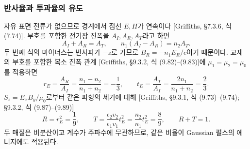 \documentclass[11pt,a4paper]{article}
\begin{document}
\subsubsection{반사율과 투과율의 유도}
자유 표면 전류가 없으므로 경계에서 접선 $E,H$가 연속이다
[Griffiths, §7.3.6, 식 (7.74)]. 부호를 포함한 전기장 진폭을 $A_I,A_R,A_T$라고 하면
\begin{equation}A_I+A_R=A_T,\qquad n_1(A_I-A_R)=n_2A_T.\end{equation}
두 번째 식의 마이너스는 반사파가 $-z$로 가므로 $B_R=-n_1E_R/c$이기 때문이다.
교재의 부호를 포함한 복소 진폭 관계 [Griffiths, §9.3.2, 식 (9.82)--(9.83)]에
$\mu_1=\mu_2=\mu_0$를 적용하면
\begin{equation}
 r_E=\frac{A_R}{A_I}=\frac{n_1-n_2}{n_1+n_2}=-\frac13,\qquad
 t_E=\frac{A_T}{A_I}=\frac{2n_1}{n_1+n_2}=\frac23.
\end{equation}
$S_z=E_xB_y/\mu_0$로부터 같은 파형의 세기에 대해
[Griffiths, §9.3.1, 식 (9.73)--(9.74); §9.3.2, 식 (9.87)--(9.89)]
\begin{equation}
 \boxed{R=r_E^2=\frac19,\qquad
 T=\frac{\epsilon_2v_2}{\epsilon_1v_1}t_E^2
 =\frac{n_2}{n_1}t_E^2=\frac89,\qquad R+T=1.}\label{eq:RT}
\end{equation}
두 매질은 비분산이고 계수가 주파수에 무관하므로, 같은 비율이 Gaussian 펄스의
에너지에도 적용된다.
\end{document}
